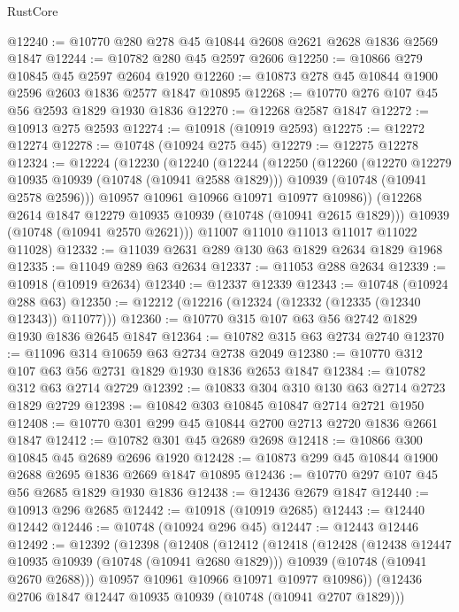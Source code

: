 \begin{lexlean}{RustCore}
\begin{coremodule}
@12240 := @10770 @280 @278 @45 @10844 @2608 @2621 @2628 @1836 @2569 @1847
@12244 := @10782 @280 @45 @2597 @2606
@12250 := @10866 @279 @10845 @45 @2597 @2604 @1920
@12260 := @10873 @278 @45 @10844 @1900 @2596 @2603 @1836 @2577 @1847 @10895
@12268 := @10770 @276 @107 @45 @56 @2593 @1829 @1930 @1836
@12270 := @12268 @2587 @1847
@12272 := @10913 @275 @2593
@12274 := @10918 (@10919 @2593)
@12275 := @12272 @12274
@12278 := @10748 (@10924 @275 @45)
@12279 := @12275 @12278
@12324 := @12224
    (@12230
      (@12240
        (@12244
          (@12250
            (@12260
              (@12270 @12279 @10935 @10939 (@10748 (@10941 @2588 @1829)))
              @10939
              (@10748 (@10941 @2578 @2596)))
            @10957
            @10961
            @10966
            @10971
            @10977
            @10986))
        (@12268 @2614 @1847 @12279 @10935 @10939 (@10748 (@10941 @2615 @1829)))
        @10939
        (@10748 (@10941 @2570 @2621)))
      @11007
      @11010
      @11013
      @11017
      @11022
      @11028)
@12332 := @11039 @2631 @289 @130 @63 @1829 @2634 @1829 @1968
@12335 := @11049 @289 @63 @2634
@12337 := @11053 @288 @2634
@12339 := @10918 (@10919 @2634)
@12340 := @12337 @12339
@12343 := @10748 (@10924 @288 @63)
@12350 := @12212 (@12216 (@12324 (@12332 (@12335 (@12340 @12343)) @11077)))
@12360 := @10770 @315 @107 @63 @56 @2742 @1829 @1930 @1836 @2645 @1847
@12364 := @10782 @315 @63 @2734 @2740
@12370 := @11096 @314 @10659 @63 @2734 @2738 @2049
@12380 := @10770 @312 @107 @63 @56 @2731 @1829 @1930 @1836 @2653 @1847
@12384 := @10782 @312 @63 @2714 @2729
@12392 := @10833 @304 @310 @130 @63 @2714 @2723 @1829 @2729
@12398 := @10842 @303 @10845 @10847 @2714 @2721 @1950
@12408 := @10770 @301 @299 @45 @10844 @2700 @2713 @2720 @1836 @2661 @1847
@12412 := @10782 @301 @45 @2689 @2698
@12418 := @10866 @300 @10845 @45 @2689 @2696 @1920
@12428 := @10873 @299 @45 @10844 @1900 @2688 @2695 @1836 @2669 @1847 @10895
@12436 := @10770 @297 @107 @45 @56 @2685 @1829 @1930 @1836
@12438 := @12436 @2679 @1847
@12440 := @10913 @296 @2685
@12442 := @10918 (@10919 @2685)
@12443 := @12440 @12442
@12446 := @10748 (@10924 @296 @45)
@12447 := @12443 @12446
@12492 := @12392
    (@12398
      (@12408
        (@12412
          (@12418
            (@12428
              (@12438 @12447 @10935 @10939 (@10748 (@10941 @2680 @1829)))
              @10939
              (@10748 (@10941 @2670 @2688)))
            @10957
            @10961
            @10966
            @10971
            @10977
            @10986))
        (@12436 @2706 @1847 @12447 @10935 @10939 (@10748 (@10941 @2707 @1829)))

\end{coremodule}
\end{lexlean}
